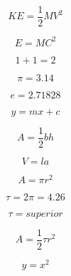 \documentclass[12pt, a4paper, oneside]{article}
\begin{document}
	$$ KE = \frac{1}{2} M V^{2} $$
		
	$$ E=MC^{2} $$
		
	$$ {1} + {1} = {2} $$
		
	$$ \pi={3.14} $$
		
	$$ e={2.71828} $$
		
	$$ y=mx+c $$
		
	$$ A=\frac{1}{2}bh $$
		
	$$ V=la $$
		
	$$ A=\pi{r}^2 $$
		
	$$ \tau={2}\pi={4.26} $$
		
	$$ \tau=superior $$
		
	$$ A=\frac{1}{2}\tau{r}^2 $$
		
	$$ y=x^{2} $$
	
\end{document}
